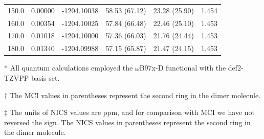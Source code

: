\begin{table}[hbt!]
\begin{threeparttable}
\begin{tabular}{cccccc}
150.0 & 0.00000 & -1204.10038 & 58.53 (67.12) & 23.28 (25.90) & 1.454 \\
160.0 & 0.00354 & -1204.10025 & 57.84 (66.48) & 22.46 (25.10) & 1.453 \\
170.0 & 0.01018 & -1204.10000 & 57.36 (66.03) & 21.76 (24.44) & 1.453 \\
180.0 & 0.01340 & -1204.09988 & 57.15 (65.87) & 21.47 (24.15) & 1.453 \\\bottomrule
\end{tabular}
\begin{tablenotes}
\item[*] \footnotesize All quantum calculations employed the $\omega$B97x-D functional with the def2-TZVPP basis set.
\item [$\dagger$] \footnotesize The MCI values in parentheses represent the second ring in the dimer molecule.
\item [$\ddagger$] \footnotesize The units of NICS values are ppm, and for comparison with MCI we have not reversed the sign. The NICS values in parentheses represent the second ring in the dimer molecule.
\end{tablenotes}
\end{threeparttable}
\end{table}

